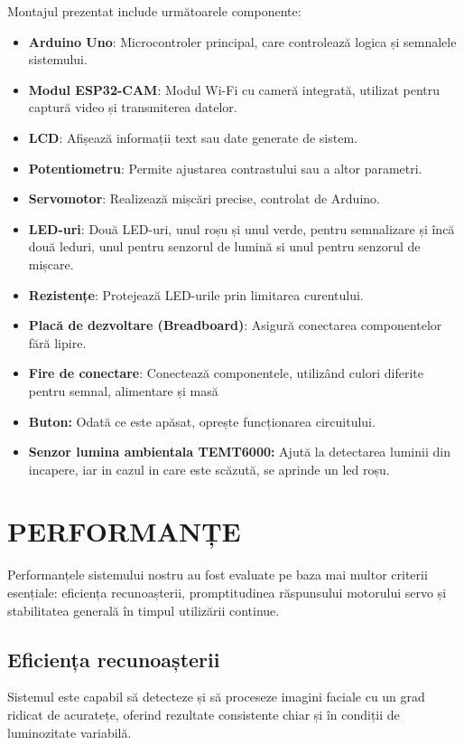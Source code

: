 \documentclass[a4paper,12pt]{report}
\begin{document}
Montajul prezentat include următoarele componente:
\begin{itemize}
    \item \textbf{Arduino Uno}: Microcontroler principal, care controlează logica și semnalele sistemului.
    \item \textbf{Modul ESP32-CAM}: Modul Wi-Fi cu cameră integrată, utilizat pentru captură video și transmiterea datelor.
    \item \textbf{LCD}: Afișează informații text sau date generate de sistem.
    \item \textbf{Potentiometru}: Permite ajustarea contrastului sau a altor parametri.
    \item \textbf{Servomotor}: Realizează mișcări precise, controlat de Arduino.
    \item \textbf{LED-uri}: Două LED-uri, unul roșu și unul verde, pentru semnalizare și încă două leduri, unul pentru senzorul de lumină si unul pentru senzorul de mișcare.
    \item \textbf{Rezistențe}: Protejează LED-urile prin limitarea curentului.
    \item \textbf{Placă de dezvoltare (Breadboard)}: Asigură conectarea componentelor fără lipire.
    \item \textbf{Fire de conectare}: Conectează componentele, utilizând culori diferite pentru semnal, alimentare și masă
    \item \textbf{Buton:} Odată ce este apăsat, oprește funcționarea circuitului.
     \item \textbf{Senzor lumina ambientala TEMT6000:} Ajută la detectarea luminii din incapere, iar in cazul in care este scăzută, se aprinde un led roșu.
    
\end{itemize}

\chapter*{PERFORMANȚE}
Performanțele sistemului nostru au fost evaluate pe baza mai multor criterii esențiale: eficiența recunoașterii, promptitudinea răspunsului motorului servo și stabilitatea generală în timpul utilizării continue.

\section{Eficiența recunoașterii}
Sistemul este capabil să detecteze și să proceseze imagini faciale cu un grad ridicat de acuratețe, oferind rezultate consistente chiar și în condiții de luminozitate variabilă.
\end{document}
